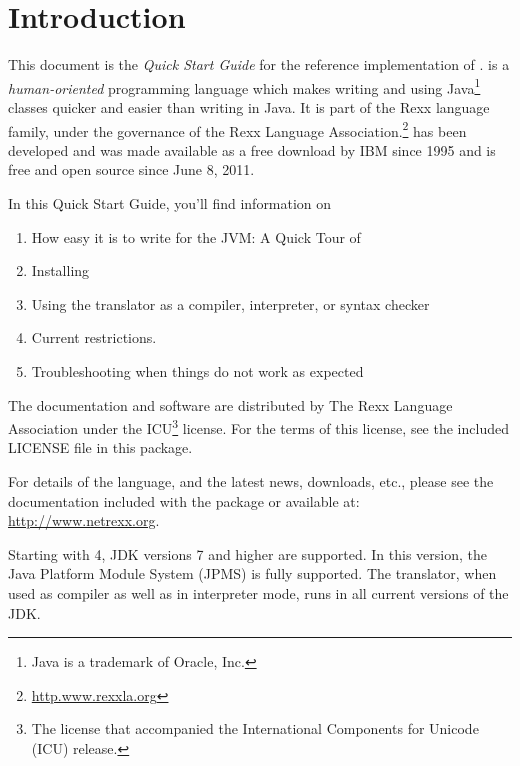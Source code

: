 \chapter{Introduction}
This document is the \emph{Quick Start Guide} for the reference implementation of
\nr{}. \nr{} is a \emph{human-oriented} programming language which makes
writing and using Java\footnote{Java is a trademark of Oracle, Inc.}
classes quicker and easier than writing in Java. It is part of the Rexx
language family, under the governance of the Rexx Language
Association.\footnote{\url{http.www.rexxla.org}} \nr{} has been
developed and was made available as a free download by IBM since 1995
and is free and open source since June 8, 2011.

In this Quick Start Guide, you’ll find information on
\begin{enumerate} 
\item How easy it is to write for the JVM: A Quick Tour of \nr{}
\item Installing \nr{} 
\item Using the \nr{} translator as a compiler, interpreter, or 
  syntax checker
\item Current restrictions.
\item Troubleshooting when things do not work as expected
\end{enumerate} 
The \nr{} documentation and software are distributed
by The Rexx Language Association under the \textsc{ICU}\footnote{The
license that accompanied the International Components for Unicode
(ICU) release.} license. For
the terms of this license, see the included \textsc{LICENSE} file in
this package.

For details of the \nr{} language, and the latest news, downloads,
etc., please see the \nr{} documentation included with the package
or available at: \url{http://www.netrexx.org}.

\begin{shaded}\noindent
Starting with \nr{} 4, JDK versions 7 and higher are supported. In
this version, the Java Platform Module System (JPMS) is fully
supported. The translator, when used as compiler as well as in
interpreter mode, runs in all current versions of the JDK.
\end{shaded}\indent
